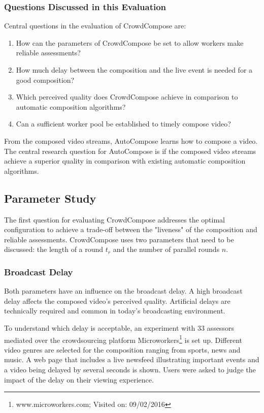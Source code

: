\subsubsection{Questions Discussed in this Evaluation}

Central questions in the evaluation of CrowdCompose are:
\begin{enumerate}
	\item How can the parameters of CrowdCompose be set to allow workers make reliable assessments?
	\item How much delay between the composition and the live event is needed for a good composition?
	\item Which perceived quality does CrowdCompose achieve in comparison to automatic composition algorithms?
	\item Can a sufficient worker pool be established to timely compose video?
\end{enumerate}
From the composed video streams, AutoCompose learns how to compose a video.
The central research question for AutoCompose is if the composed video streams achieve a superior quality in comparison with existing automatic composition algorithms.
\subsection{Parameter Study}
\label{sec:690_eval_crowdcompose}
The first question for evaluating CrowdCompose addresses the optimal configuration to achieve a trade-off between the "liveness" of the composition and reliable assessments.
CrowdCompose uses two parameters that need to be discussed: the length of a round $t_{r}$ and the number of parallel rounds $n$. 

\subsubsection{Broadcast Delay}
Both parameters have an influence on the broadcast delay.
A high broadcast delay affects the composed video's perceived quality. 
Artificial delays are technically required and common in today's broadcasting environment.

To understand which delay is acceptable, an experiment with 33 assessors mediated over the crowdsourcing platform Microworkers\footnote{www.microworkers.com; Visited on: 09/02/2016} is set up.
Different video genres are selected for the composition ranging from sports, news and music.  
A web page that includes a live newsfeed  illustrating important events and a video being delayed by several seconds is shown. 
Users were asked to judge the impact of the delay on their viewing experience.

